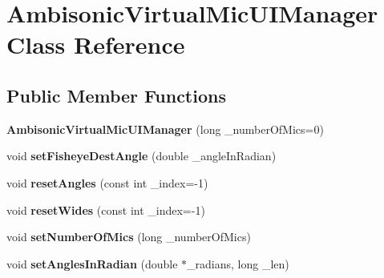 \hypertarget{class_ambisonic_virtual_mic_u_i_manager}{\section{Ambisonic\-Virtual\-Mic\-U\-I\-Manager Class Reference}
\label{class_ambisonic_virtual_mic_u_i_manager}
}
\subsection*{Public Member Functions}
\begin{DoxyCompactItemize}
\item 
\hypertarget{class_ambisonic_virtual_mic_u_i_manager_a8664c9311905b4c058717d428306065b}{{\bfseries Ambisonic\-Virtual\-Mic\-U\-I\-Manager} (long \-\_\-number\-Of\-Mics=0)}\label{class_ambisonic_virtual_mic_u_i_manager_a8664c9311905b4c058717d428306065b}

\item 
\hypertarget{class_ambisonic_virtual_mic_u_i_manager_a7579bfaab5f198670850f96bb50d8a19}{void {\bfseries set\-Fisheye\-Dest\-Angle} (double \-\_\-angle\-In\-Radian)}\label{class_ambisonic_virtual_mic_u_i_manager_a7579bfaab5f198670850f96bb50d8a19}

\item 
\hypertarget{class_ambisonic_virtual_mic_u_i_manager_a061d76de579d06868925e468084c10cb}{void {\bfseries reset\-Angles} (const int \-\_\-index=-\/1)}\label{class_ambisonic_virtual_mic_u_i_manager_a061d76de579d06868925e468084c10cb}

\item 
\hypertarget{class_ambisonic_virtual_mic_u_i_manager_a149326d8ee5897c403b4d3936b46503c}{void {\bfseries reset\-Wides} (const int \-\_\-index=-\/1)}\label{class_ambisonic_virtual_mic_u_i_manager_a149326d8ee5897c403b4d3936b46503c}

\item 
\hypertarget{class_ambisonic_virtual_mic_u_i_manager_a35ff374bff689483b9784f8128ee4051}{void {\bfseries set\-Number\-Of\-Mics} (long \-\_\-number\-Of\-Mics)}\label{class_ambisonic_virtual_mic_u_i_manager_a35ff374bff689483b9784f8128ee4051}

\item 
\hypertarget{class_ambisonic_virtual_mic_u_i_manager_aa8c1d188097393569f65df5e3445911e}{void {\bfseries set\-Angles\-In\-Radian} (double $\ast$\-\_\-radians, long \-\_\-len)}\label{class_ambisonic_virtual_mic_u_i_manager_aa8c1d188097393569f65df5e3445911e}


\end{DoxyCompactItemize}
